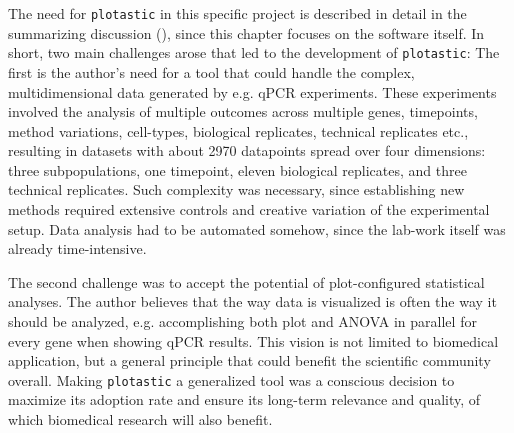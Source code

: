 
The need for \texttt{plotastic} in this specific project is described in detail
in the summarizing discussion
(), since this chapter focuses
on the software itself. In short, two main challenges arose that led to the
development of \texttt{plotastic}: The first is the author's need for a tool
that could handle the complex, multidimensional data generated by e.g. qPCR
experiments. These experiments involved the analysis of multiple outcomes across
multiple genes, timepoints, method variations, cell-types, biological
replicates, technical replicates etc., resulting in datasets with about 2970
datapoints spread over four dimensions: three subpopulations, one timepoint,
eleven biological replicates, and three technical replicates. Such complexity
was necessary, since establishing new methods required extensive controls and
creative variation of the experimental setup. Data analysis had to be automated
somehow, since the lab-work itself was already time-intensive. 

The second challenge was to accept the potential of plot-configured statistical
analyses. The author believes that the way data is visualized is often the way
it should be analyzed, e.g. accomplishing both plot and ANOVA in parallel for
every gene when showing qPCR results. This vision is not limited to biomedical
application, but a general principle that could benefit the scientific community
overall. Making \texttt{plotastic} a generalized tool was a conscious decision
to maximize its adoption rate and ensure its long-term relevance and quality, of
which biomedical research will also benefit.













